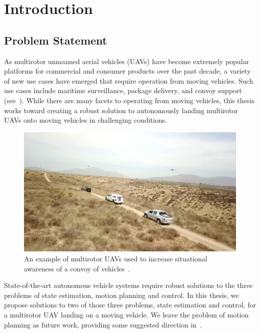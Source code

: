 
\chapter{Introduction}
\label{chp:introduction}

\section{Problem Statement}
As multirotor unmanned aerial vehicles (UAVs) have become extremely popular
platforms for commercial and consumer products over the past decade, a variety
of new use cases have emerged that require operation from moving vehicles.
Such use cases include
maritime surveillance, package delivery, and convoy
support (see~). While there are
many facets to operating from moving vehicles, this thesis works toward creating
a robust solution to autonomously landing multirotor UAVs onto moving vehicles
in challenging conditions.

\begin{figure}[t]
  \centering
  \includegraphics[width=5.5in]{figures/drone_convoy_support.png}
  \caption[UAV Convoy Support]{An example of multirotor UAVs used to increase
  situational awareness of a convoy of
vehicles~\cite{ground_vehicle_based_drones}.}
%
  \label{fig:drone_convoy_support}
\end{figure}

State-of-the-art autonomous vehicle systems require robust solutions to the
three problems of state estimation, motion planning and control. In this thesis,
we propose solutions to two of those three problems, state estimation and
control, for a multirotor UAV landing on a moving vehicle. We leave the problem
of motion planning as future work, providing some suggested direction
in~.

